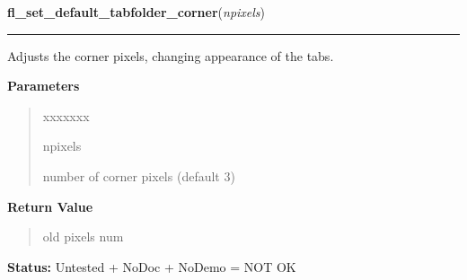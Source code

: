 \hspace{.8\funcindent}\begin{boxedminipage}{\funcwidth}

    \raggedright \textbf{fl\_set\_default\_tabfolder\_corner}(\textit{npixels})

    \vspace{-1.5ex}

    \rule{\textwidth}{0.5\fboxrule}
\setlength{\parskip}{2ex}
    Adjusts the corner pixels, changing appearance of the tabs.

\setlength{\parskip}{1ex}
      \textbf{Parameters}
      \vspace{-1ex}

      \begin{quote}
        \begin{Ventry}{xxxxxxx}

          \item[npixels]

          number of corner pixels (default 3)

        \end{Ventry}

      \end{quote}

      \textbf{Return Value}
    \vspace{-1ex}

      \begin{quote}
      old pixels num

      \end{quote}

\textbf{Status:} Untested + NoDoc + NoDemo = NOT OK



    \end{boxedminipage}

    \label{xformslib:library:fl_set_tabfolder_offset}

    \vspace{0.5ex}

